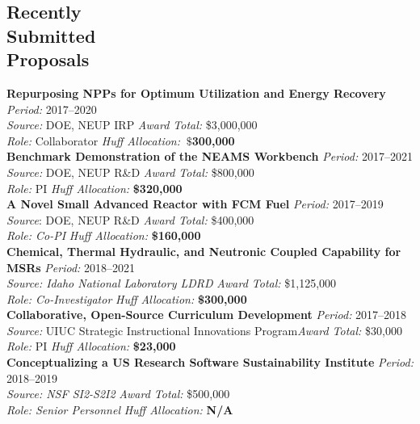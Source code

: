 \documentclass[margin,line]{resume}
\begin{document}
\begin{resume}
    \section{\mysidestyle Recently\\Submitted\\Proposals}
    \textbf{Repurposing NPPs for Optimum Utilization and Energy Recovery} \hfill \textsl{Period:} 2017--2020\\
    \textsl{Source:} DOE, NEUP IRP \hfill \textsl{Award Total:} \$3,000,000\\
    \textsl{Role:} Collaborator \hfill \textsl{Huff Allocation:} \textbf{$~\$$300,000}\vspace{2mm}\\%
    \textbf{Benchmark Demonstration of the NEAMS Workbench} \hfill \textsl{Period:} 2017--2021\\
    \textsl{Source:} DOE, NEUP R\&D \hfill \textsl{Award Total:} \$800,000\\
    \textsl{Role:} PI \hfill \textsl{Huff Allocation:} \textbf{\$320,000}\vspace{2mm}\\%
    \textbf{A Novel Small Advanced Reactor with FCM Fuel} \hfill \textsl{Period:} 2017--2019\\
    \textsl{Source}: DOE, NEUP R\&D \hfill \textsl{Award Total:} \$400,000\\
    \textsl{Role: Co-PI} \hfill \textsl{Huff Allocation:} \textbf{\$160,000}\vspace{2mm}\\%
    \textbf{Chemical, Thermal Hydraulic, and Neutronic Coupled Capability for MSRs} \hfill \textsl{Period:} 2018--2021\\
    \textsl{Source: Idaho National Laboratory LDRD} \hfill \textsl{Award Total:} \$1,125,000\\
    \textsl{Role: Co-Investigator} \hfill \textsl{Huff Allocation:} \textbf{\$300,000}\vspace{2mm}\\%
    \textbf{Collaborative, Open-Source Curriculum Development} \hfill \textsl{Period:} 2017--2018\\
    \textsl{Source:} UIUC Strategic Instructional Innovations Program\hfill \textsl{Award Total:} \$30,000\\
    \textsl{Role:} PI \hfill \textsl{Huff Allocation:} \textbf{\$23,000}\vspace{2mm}\\%
    \textbf{Conceptualizing a US Research Software Sustainability Institute} \hfill \textsl{Period:} 2018--2019\\
    \hfill \textsl{Source: NSF SI2-S2I2} \hfill \textsl{Award Total:} \$500,000\\
    \hfill \textsl{Role: Senior Personnel} \hfill \textsl{Huff Allocation:} \textbf{N/A}

\end{resume}
\end{document}
